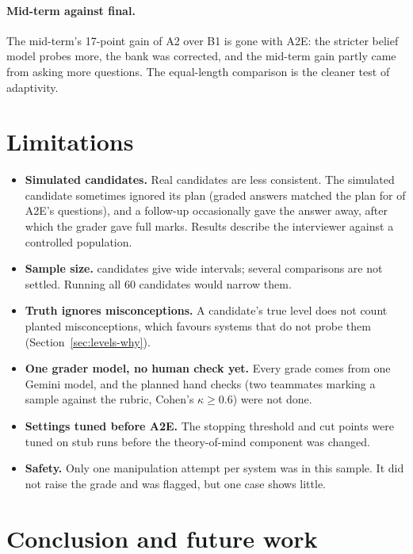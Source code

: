 \documentclass[10pt,a4paper]{article}
\begin{document}
\paragraph{Mid-term against final.} The mid-term's 17-point gain of A2 over B1 is gone with A2E: the
stricter belief model probes more, the bank was corrected, and the mid-term gain partly came from
asking more questions. The equal-length comparison is the cleaner test of adaptivity.

\section{Limitations}

\begin{itemize}
  \item \textbf{Simulated candidates.} Real candidates are less consistent. The simulated candidate
  sometimes ignored its plan (graded answers matched the plan for \fGradingMatchFull{} of A2E's
  questions), and a follow-up occasionally gave the answer away, after which the grader gave full
  marks. Results describe the interviewer against a controlled population.
  \item \textbf{Sample size.} \fN{} candidates give wide intervals; several comparisons are not
  settled. Running all 60 candidates would narrow them.
  \item \textbf{Truth ignores misconceptions.} A candidate's true level does not count planted
  misconceptions, which favours systems that do not probe them (Section~\ref{sec:levels-why}).
  \item \textbf{One grader model, no human check yet.} Every grade comes from one Gemini model, and the
  planned hand checks (two teammates marking a sample against the rubric, Cohen's $\kappa \ge 0.6$)
  were not done.
  \item \textbf{Settings tuned before A2E.} The stopping threshold and cut points were tuned on stub
  runs before the theory-of-mind component was changed.
  \item \textbf{Safety.} Only one manipulation attempt per system was in this sample. It did not raise
  the grade and was flagged, but one case shows little.
\end{itemize}

\section{Conclusion and future work}
\end{document}
